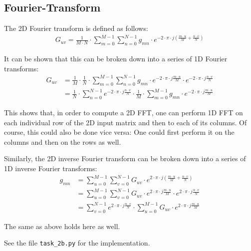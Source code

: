 \documentclass[a4paper,twocolumn]{article}
\begin{document}
	\subsection{Fourier-Transform}
	
	The 2D Fourier transform is defined as follows:
	\begin{align*}
	G_{uv} = \frac{1}{M \cdot N} \cdot
	\sum_{m=0}^{M-1} \sum_{n=0}^{N-1} g_{mn} \cdot
	e^{-2 \cdot  \pi \cdot j (\frac{m \cdot u}{M} + \frac{n \cdot v}{N})}
	\end{align*}
	
	It can be shown that this can be broken down into a series of 1D Fourier transforms:
	\begin{align*}
	G_{uv}
	&= \frac{1}{M} \cdot \frac{1}{N} \cdot
	\sum_{m=0}^{M-1} \sum_{n=0}^{N-1} g_{mn} \cdot
	e^{-2 \cdot  \pi \cdot j \frac{m \cdot u}{M}} \cdot
	e^{-2 \cdot  \pi \cdot j \frac{n \cdot v}{N}} \\
	&= \frac{1}{N} \cdot \sum_{n=0}^{N-1}
	e^{-2 \cdot  \pi \cdot j \frac{n \cdot v}{N}} \cdot
	\frac{1}{M} \cdot \sum_{m=0}^{M-1}
	g_{mn} \cdot
	e^{-2 \cdot  \pi \cdot j \frac{m \cdot u}{M}}
	\end{align*}
	
	This shows that, in order to compute a 2D FFT, one can perform 1D FFT on each individual row of the 2D input matrix and then to each of its columns. Of course, this could also be done vice versa: One could first perform it on the columns and then on the rows as well.
	
	Similarly, the 2D inverse Fourier transform can be broken down into a series of 1D inverse Fourier transforms:
	\begin{align*}
	g_{mn}
	&= \sum_{u=0}^{M-1} \sum_{v=0}^{N-1} G_{uv} \cdot
	e^{2 \cdot  \pi \cdot j (\frac{m \cdot u}{M} + \frac{n \cdot v}{N})} \\
	&= \sum_{u=0}^{M-1} \sum_{v=0}^{N-1} G_{uv} \cdot
	e^{2 \cdot  \pi \cdot j \frac{m \cdot u}{M}} \cdot
	e^{2 \cdot  \pi \cdot j \frac{n \cdot v}{N}} \\
	&= \sum_{v=0}^{N-1} e^{2 \cdot \pi \cdot j \frac{n \cdot v}{N}} \cdot
	\sum_{u=0}^{M-1} G_{uv} \cdot
	e^{2 \cdot  \pi \cdot j \frac{m \cdot u}{M}}
	\end{align*}
	
	The same as above holds here as well.
	
	See the file \texttt{task\_2b.py} for the implementation.
	
\end{document}
